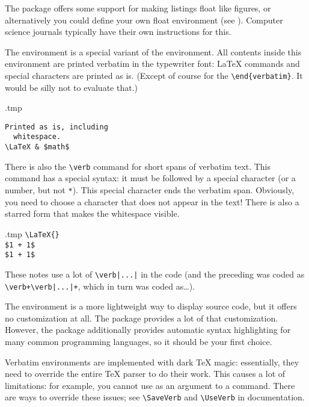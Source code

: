 The package offers some support for making listings float like figures,
or alternatively you could define your own float environment (see ).
Computer science journals typically have their own instructions for this.

The  environment is a special variant of the  environment.
All contents inside this environment are printed verbatim
in the typewriter font: \LaTeX{} commands and special characters are printed as is.
(Except of course for the \verb|\end{verbatim}|.
It would be silly not to evaluate that.)

\begin{VerbatimOut}{\jobname.tmp}
\begin{verbatim}
Printed as is, including
  whitespace.
\LaTeX & $math$
\end{verbatim}
\end{VerbatimOut}
\ShowExample

There is also the \verb|\verb| command for short spans of verbatim text.
This command has a special syntax:
it must be followed by a special character (or a number, but not \verb|*|).
This special character ends the verbatim span.
Obviously, you need to choose a character that does not appear in the text!
There is also a starred form that makes the whitespace visible.

\begin{VerbatimOut}{\jobname.tmp}
\verb+\LaTeX{}+ \\
\verb|$1 + 1$| \\
\verb*|$1 + 1$|
\end{VerbatimOut}
\ShowExample
%
These notes use a lot of \verb+\verb|...|+ in the code
(and the preceding was coded as
\verb!\verb+\verb|...|+!, which in turn was coded as\dots).

The  environment is a more lightweight way to display source code,
but it offers no customization at all.
The  package provides a lot of that customization.
However, the  package additionally provides automatic syntax highlighting
for many common programming languages, so it should be your first choice.

\begin{technote}
Verbatim environments are implemented with dark \TeX{} magic:
essentially, they need to override the entire \TeX{} parser to do their work.
This causes a lot of limitations:
for example, you cannot use  as an argument to a command.
There are ways to override these issues;
see \verb|\SaveVerb| and \verb|\UseVerb| in  documentation.
\end{technote}


